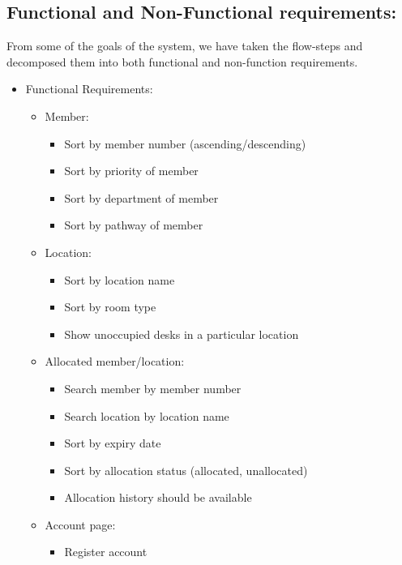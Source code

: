 \documentclass[11pt,a4paper]{article}
\begin{document}
\subsection{Functional and Non-Functional requirements:}
From some of the goals of the system, we have taken the flow-steps and decomposed them into both functional and non-function requirements.

\begin{itemize}
    \item Functional Requirements:
        \begin{itemize}
            \item Member:
                \begin{itemize}
                    \item Sort by member number (ascending/descending)
                    \item Sort by priority of member
                    \item Sort by department of member
                    \item Sort by pathway of member
                \end{itemize}
            \item Location:
                \begin{itemize}
                    \item Sort by location name
                    \item Sort by room type
                    \item Show unoccupied desks in a particular location
                \end{itemize}
            \item Allocated member/location:
                \begin{itemize}
                    \item Search member by member number
                    \item Search location by location name
                    \item Sort by expiry date
                    \item Sort by allocation status (allocated, unallocated)
                    \item Allocation history should be available
                \end{itemize}
            \item Account page:
                \begin{itemize}
                    \item Register account

\end{itemize}
\end{itemize}
\end{itemize}
\end{document}
